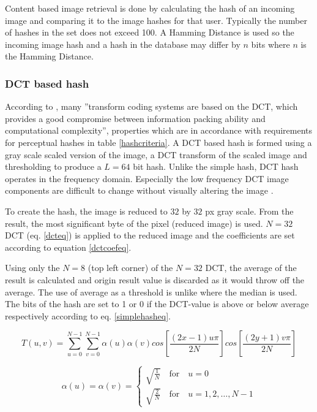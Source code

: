 \documentclass[english,12pt,a4paper,pdftex,elec,utf8, table]{aaltothesis}
\begin{document}
Content based image retrieval is done by calculating the hash of an incoming image and comparing it to the image hashes for that user. Typically the number of hashes in the set does not exceed 100. A Hamming Distance is used so the incoming image hash and a hash in the database may differ by $n$ bits where $n$ is the Hamming Distance.

\subsubsection{DCT based hash}
According to \cite{Gonzalez2002}, many ''transform coding systems are based on the DCT, which provides a good compromise between information packing ability and computational complexity'', properties which are in accordance with requirements for perceptual hashes in table \ref{hashcriteria}. A DCT based hash is formed using a gray scale scaled version of the image, a DCT transform of the scaled image and thresholding to produce a $L=64$ bit hash. Unlike the simple hash, DCT hash operates in the frequency domain. Especially the low frequency DCT image components are difficult to change without visually altering the image \cite{Fridrich1999}.

To create the hash, the image is reduced to $32$ by $32$ px gray scale. From the result, the most significant byte of the pixel (reduced image) is used. $N=32$ DCT (eq. \ref{dcteq}) is applied to the reduced image and the coefficients are set according to equation \ref{dctcoefeq}.

Using only the $N=8$ (top left corner) of the $N=32$ DCT, the average of the result is calculated and origin result value is discarded as it would throw off the average. The use of average as a threshold is unlike \cite{Coskun2004} where the median is used. The bits of the hash are set to 1 or 0 if the DCT-value is above or below average respectively according to eq. \ref{simplehasheq}.

\begin{equation}\label{dcteq}
T(u,v)= \sum_{u=0}^{N-1} \sum_{v=0}^{N-1}\alpha(u)\alpha(v)cos\left[\frac{(2x-1)u\pi}{2N}\right]cos\left[\frac{(2y + 1)v\pi}{2N}\right]
\end{equation}

\begin{equation}\label{dctcoefeq}
  \alpha(u) = \alpha(v)= \begin{cases}
    \sqrt{\frac{1}{N}} \quad \textrm{for} \quad u=0\\
    \sqrt{\frac{2}{N}} \quad \textrm{for} \quad u=1,2,\ldots,N-1
    \end{cases}
\end{equation}
\end{document}
